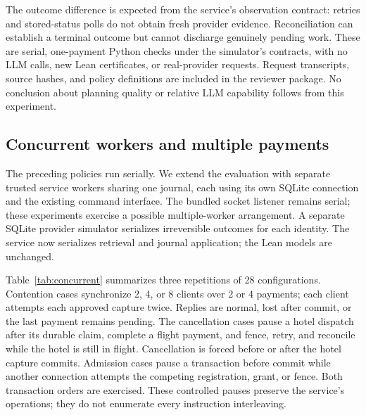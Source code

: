 \documentclass[11pt]{article}
\begin{document}
The outcome difference is expected from the service's observation contract:
retries and stored-status polls do not obtain fresh provider evidence.
Reconciliation can establish a terminal outcome but cannot discharge genuinely
pending work. These are serial, one-payment Python checks under the simulator's
contracts, with no LLM calls, new Lean certificates, or real-provider requests.
Request transcripts, source hashes, and policy definitions are included in the
reviewer package. No conclusion about planning quality or relative LLM capability
follows from this experiment.

\subsection{Concurrent workers and multiple payments}
\label{sec:concurrent}
The preceding policies run serially. We extend the evaluation with separate
trusted service workers sharing one journal, each using its own SQLite connection
and the existing command interface. The bundled socket listener remains serial;
these experiments exercise a possible multiple-worker arrangement. A separate
SQLite provider simulator serializes irreversible outcomes for each identity.
The service now serializes retrieval and journal application; the Lean models
are unchanged.

Table~\ref{tab:concurrent} summarizes three repetitions of 28 configurations.
Contention cases synchronize 2, 4, or 8 clients over 2 or 4 payments; each client
attempts each approved capture twice. Replies are normal, lost after commit, or
the last payment remains pending. The cancellation cases pause a hotel dispatch
after its durable claim, complete a flight payment, and fence, retry, and reconcile
while the hotel is still in flight. Cancellation is forced before or after the
hotel capture commits. Admission cases pause a transaction before commit while
another connection attempts the competing registration, grant, or fence. Both
transaction orders are exercised. These controlled pauses preserve the service's
operations; they do not enumerate every instruction interleaving.
\end{document}
